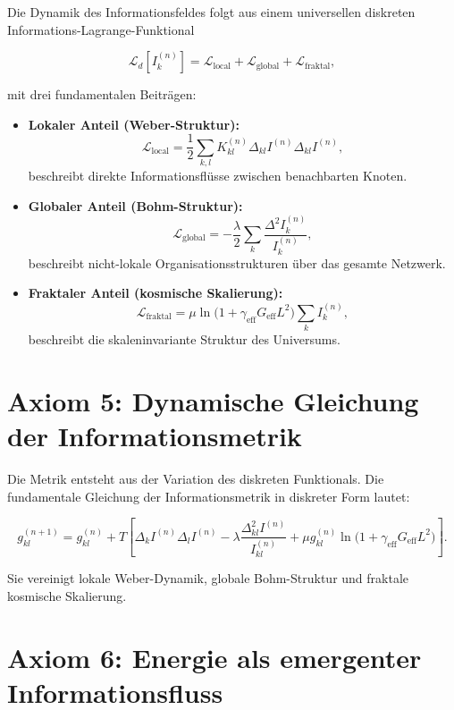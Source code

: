 Die Dynamik des Informationsfeldes folgt aus einem universellen diskreten Informations-Lagrange-Funktional

\[
\mathcal{L}_d[I_k^{(n)}] = \mathcal{L}_{\text{local}} + \mathcal{L}_{\text{global}} + \mathcal{L}_{\text{fraktal}},
\]

mit drei fundamentalen Beiträgen:

\begin{itemize}
    \item \textbf{Lokaler Anteil (Weber-Struktur):}  
    \[
    \mathcal{L}_{\text{local}} = \frac{1}{2} \sum_{k,l} K_{kl}^{(n)} \Delta_{kl} I^{(n)} \Delta_{kl} I^{(n)},
    \]
    beschreibt direkte Informationsflüsse zwischen benachbarten Knoten.

    \item \textbf{Globaler Anteil (Bohm-Struktur):}  
    \[
    \mathcal{L}_{\text{global}} = -\frac{\lambda}{2} \sum_k \frac{\Delta^2 I_k^{(n)}}{I_k^{(n)}},
    \]
    beschreibt nicht-lokale Organisationsstrukturen über das gesamte Netzwerk.

    \item \textbf{Fraktaler Anteil (kosmische Skalierung):}  
    \[
    \mathcal{L}_{\text{fraktal}} = \mu \ln\!\bigl(1 + \gamma_{\text{eff}} G_{\text{eff}} L^2\bigr) \sum_k I_k^{(n)},
    \]
    beschreibt die skaleninvariante Struktur des Universums.
\end{itemize}

\section{Axiom 5: Dynamische Gleichung der Informationsmetrik}
\label{sec:axiom5}

Die Metrik entsteht aus der Variation des diskreten Funktionals. Die fundamentale Gleichung der Informationsmetrik in diskreter Form lautet:

\[
g_{kl}^{(n+1)} = g_{kl}^{(n)} + T \left[ \Delta_k I^{(n)} \Delta_l I^{(n)} - \lambda \frac{\Delta_{kl}^2 I^{(n)}}{I_{kl}^{(n)}} + \mu g_{kl}^{(n)} \ln\!\bigl(1 + \gamma_{\text{eff}} G_{\text{eff}} L^2\bigr) \right].
\]

Sie vereinigt lokale Weber-Dynamik, globale Bohm-Struktur und fraktale kosmische Skalierung.

\section{Axiom 6: Energie als emergenter Informationsfluss}
\label{sec:axiom6}

